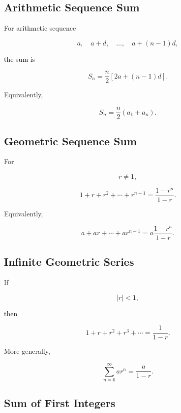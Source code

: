 \subsection{Arithmetic Sequence Sum}
\label{subsec:arithmetic-sequence-sum-identity}

For arithmetic sequence

\[
a,
\quad
a+d,
\quad
\ldots,
\quad
a+(n-1)d,
\]

the sum is

\[
\boxed{
S_n
=
\frac{n}{2}
\left[
2a+(n-1)d
\right].
}
\]

Equivalently,

\[
\boxed{
S_n
=
\frac{n}{2}
(a_1+a_n).
}
\]

\subsection{Geometric Sequence Sum}
\label{subsec:geometric-sequence-sum-identity}

For

\[
r\neq1,
\]

\[
\boxed{
1+r+r^2+\cdots+r^{n-1}
=
\frac{
1-r^n
}{
1-r
}.
}
\]

Equivalently,

\[
\boxed{
a+ar+\cdots+ar^{n-1}
=
a
\frac{
1-r^n
}{
1-r
}.
}
\]

\subsection{Infinite Geometric Series}
\label{subsec:infinite-geometric-series-reference}

If

\[
|r|<1,
\]

then

\[
\boxed{
1+r+r^2+r^3+\cdots
=
\frac{1}{1-r}.
}
\]

More generally,

\[
\boxed{
\sum_{n=0}^{\infty}
ar^n
=
\frac{a}{1-r}.
}
\]

\subsection{Sum of First Integers}
\label{subsec:sum-first-integers}

